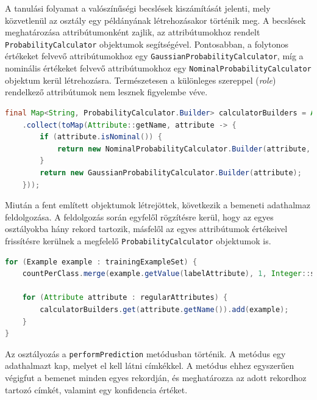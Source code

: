 \documentclass[a4paper]{article}
\begin{document}
A tanulási folyamat a valószínűségi becslések kiszámítását jelenti, mely közvetlenül az osztály egy példányának létrehozásakor történik meg. A becslések meghatározása attribútumonként zajlik, az attribútumokhoz rendelt \texttt{ProbabilityCalculator} objektumok segítségével. Pontosabban, a folytonos értékeket felvevő attribútumokhoz egy \texttt{GaussianProbabilityCalculator}, míg a nominális értékeket felvevő attribútumokhoz egy \texttt{NominalProbabilityCalculator} objektum kerül létrehozásra. Természetesen a különleges szereppel (\textit{role}) rendelkező attribútumok nem lesznek figyelembe véve.

\begin{lstlisting}[language=Java, caption={A valószínűségi becsléseket meghatározó \texttt{ProbabilityCalculator} objektumok létrehozása.}, captionpos=b, escapechar=$]
final Map<String, ProbabilityCalculator.Builder> calculatorBuilders = Arrays.stream(regularAttributes)
    .collect(toMap(Attribute::getName, attribute -> {
        if (attribute.isNominal()) {
            return new NominalProbabilityCalculator.Builder(attribute, m, priors);
        }
        return new GaussianProbabilityCalculator.Builder(attribute);
    }));
\end{lstlisting}

Miután a fent említett objektumok létrejöttek, következik a bemeneti adathalmaz feldolgozása. A feldolgozás során egyfelől rögzítésre kerül, hogy az egyes osztályokba hány rekord tartozik, másfelől az egyes attribútumok értékeivel frissítésre kerülnek a megfelelő \texttt{ProbabilityCalculator} objektumok is.

\begin{lstlisting}[language=Java, caption={A bemeneti adathalmaz feldolgozása.}, captionpos=b, escapechar=$]
for (Example example : trainingExampleSet) {
    countPerClass.merge(example.getValue(labelAttribute), 1, Integer::sum);

    for (Attribute attribute : regularAttributes) {
        calculatorBuilders.get(attribute.getName()).add(example);
    }
}
\end{lstlisting}

Az osztályozás a \texttt{performPrediction} metódusban történik. A metódus egy adathalmazt kap, melyet el kell látni címkékkel. A metódus ehhez egyszerűen végigfut a bemenet minden egyes rekordján, és meghatározza az adott rekordhoz tartozó címkét, valamint egy konfidencia értéket.
\end{document}
